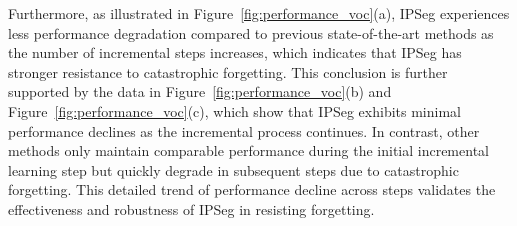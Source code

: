 Furthermore, as illustrated in Figure~\ref{fig:performance_voc}(a), IPSeg experiences less performance degradation compared to previous state-of-the-art methods as the number of incremental steps increases, which indicates that IPSeg has stronger resistance to catastrophic forgetting. This conclusion is further supported by the data in Figure~\ref{fig:performance_voc}(b) and Figure~\ref{fig:performance_voc}(c), which show that IPSeg exhibits minimal performance declines as the incremental process continues. In contrast, other methods only maintain comparable performance during the initial incremental learning step but quickly degrade in subsequent steps due to catastrophic forgetting. This detailed trend of performance decline across steps validates the effectiveness and robustness of IPSeg in resisting forgetting.






